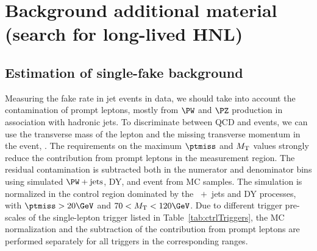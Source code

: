 
\chapter{Background additional material (search for long-lived HNL)} \label{AppendixA} 

\section{Estimation of single-fake background}\label{app:sfr}

Measuring the fake rate in jet events in data, we should take into
account the contamination of prompt leptons, mostly from $\PW$ and
$\PZ$ production in association with hadronic jets. To discriminate
between QCD and \PW events, we can use the transverse mass of the
lepton and the missing transverse momentum in the event, \MT.
The requirements on the maximum $\ptmiss$ and $M_{\mathrm{T}}$ values
strongly reduce the contribution from prompt leptons in the
measurement region.
The residual contamination is subtracted both in the numerator and
denominator \ptc bins using simulated $\PW+\mathrm{jets}$, DY, and
\ttbar event from MC samples. The simulation is normalized in the
control region dominated by the \PW~$+$~jets and DY processes, with
$\ptmiss>20\GeV$ and $70<\MT<120\GeV$.
Due to different trigger pre-scales of the single-lepton trigger
listed in Table~\ref{tab:ctrlTriggers}, the MC normalization and the
subtraction of the contribution from prompt leptons are performed
separately for all triggers in the corresponding \pt ranges.

